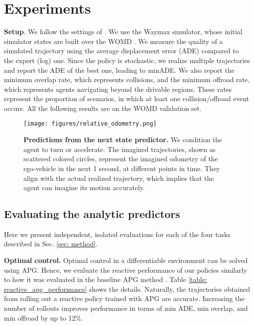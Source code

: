 \section{Experiments}
\label{sec: experiments}

\textbf{Setup}. We follow the settings of \cite{nachkov2024autonomous}. We use the Waymax simulator, whose initial simulator states are built over the WOMD \cite{ettinger2021large}. We measure the quality of a simulated trajectory using the average displacement error (ADE) compared to the expert (log) one. Since the policy is stochastic, we realize multiple trajectories and report the ADE of the best one, leading to minADE. We also report the minimum overlap rate, which represents collisions, and the minimum offroad rate, which represents agents navigating beyond the drivable regions. These rates represent the proportion of scenarios, in which at least one collision/offroad event occurs. All the following results are on the WOMD validation set. 

\begin{figure*}[t]
    \centering
    \texttt{[image: figures/relative\_odometry.png]}
    \captionsetup{belowskip=-0.35cm, aboveskip=0.2cm}
    \caption{\textbf{Predictions from the next state predictor.} We condition the agent to turn or accelerate. The imagined trajectories, shown as scattered colored circles, represent the imagined odometry of the ego-vehicle in the next 1 second, at different points in time. They align with the actual realized trajectory, which implies that the agent can imagine its motion accurately.}
    \label{fig: relative_odometry_trajectories}
\end{figure*}

\subsection{Evaluating the analytic predictors}
Here we present independent, isolated evaluations for each of the four tasks described in Sec. \ref{sec: method}.

\textbf{Optimal control.} Optimal control in a differentiable environment can be solved using APG. Hence, we evaluate the reactive performance of our policies similarly to how it was evaluated in the baseline APG method \cite{nachkov2024autonomous}. Table \ref{table: reactive_apg_performance} shows the details. Naturally, the trajectories obtained from rolling out a reactive policy trained with APG are accurate. Increasing the number of rollouts improves performance in terms of min ADE, min overlap, and min offroad by up to 12\%.

